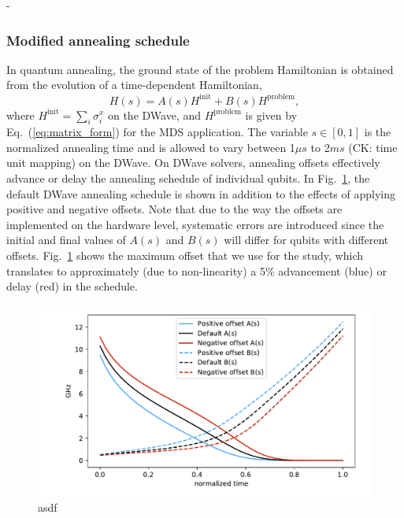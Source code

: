 -\documentclass[prd,twocolumn,tightenlines,preprintnumbers,showpacs,superscriptaddress,notitlepage,nofootinbib,eqsecnum,floatfix,longbibliography]{revtex4}
\begin{document}
\subsubsection{Modified annealing schedule}

In quantum annealing, the ground state of the problem Hamiltonian is obtained from the evolution of a time-dependent Hamiltonian,
\begin{equation}
    H(s) = A(s) H^{\textrm{init}} + B(s) H^{\textrm{problem}}, \label{eq:tdhamiltonian}
\end{equation}
where $H^\textrm{init}=\sum_i\sigma^x_i$ on the DWave, and $H^\textrm{problem}$ is given by Eq.~(\ref{eq:matrix_form}) for the MDS application.
The variable $s\in [0, 1]$ is the normalized annealing time and is allowed to vary between 1$\mu s$ to 2$ms$ (CK: time unit mapping) on the DWave.
On DWave solvers, annealing offsets effectively advance or delay the annealing schedule of individual qubits.
In Fig.~\ref{fig:anneal_schedule}, the default DWave annealing schedule is shown in addition to the effects of applying positive and negative offsets.
Note that due to the way the offsets are implemented on the hardware level, systematic errors are introduced since the initial and final values of $A(s)$ and $B(s)$ will differ for qubits with different offsets.
Fig.~\ref{fig:anneal_schedule} shows the maximum offset that we use for the study, which translates to approximately (due to non-linearity) a 5\% advancement (blue) or delay (red) in the schedule.

\begin{figure}[b]
    \centering
    \includegraphics[width=\columnwidth]{./figures/anneal_schedule.pdf}
    \caption{asdf}
    \label{fig:anneal_schedule}
\end{figure}
\end{document}
